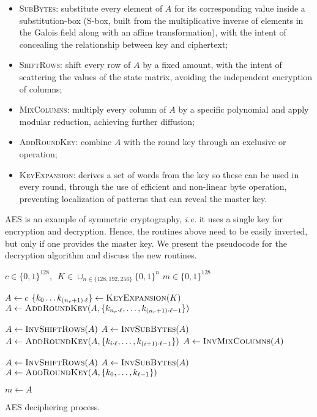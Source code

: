 \documentclass{../sftex/sftex}
\newcommand{\binwds}[1]{\{0, 1\}^{#1}}
\begin{document}
\begin{itemize}
  \item \textsc{SubBytes}: substitute every element of $A$ for its
      corresponding value inside a substitution-box (S-box, built from the
        multiplicative inverse of elements in the Galois field along with an
        affine transformation), with the intent of concealing the relationship
        between key and ciphertext;
  \item \textsc{ShiftRows}: shift every row of $A$ by a fixed amount, with the
      intent of scattering the values of the state matrix, avoiding the
        independent encryption of columns;
  \item \textsc{MixColumns}: multiply every column of $A$ by a specific
      polynomial and apply modular reduction, achieving further diffusion;
  \item \textsc{AddRoundKey}: combine $A$ with the round key through an
      exclusive or operation;
  \item \textsc{KeyExpansion}: derives a set of words from the key so these can
      be used in every round, through the use of efficient and non-linear byte
        operation, preventing localization of patterns that can reveal the
        master key.
\end{itemize}

AES is an example of symmetric cryptography, \emph{i.e.} it uses a single key
for encryption and decryption. Hence, the routines above need to be easily
inverted, but only if one provides the master key. We present the pseudocode
for the decryption algorithm and discuss the new routines.

\begin{algorithm}
  \begin{algorithmic}
    \REQUIRE{}  $c \in \binwds{128}, \enspace
      K \in \cup_{n \in \{128, 192, 256\}} \binwds{n}$
    \ENSURE{}  $m \in \binwds{128}$ 

    \STATE{}  $A \leftarrow c$
    \STATE{}  $\{k_{0} \dots k_{(n_{r} + 1) \cdot \ell}\}
      \leftarrow \textsc{KeyExpansion}(K)$
    \STATE{}  $A \leftarrow \textsc{AddRoundKey}(A,
      \{k_{n_{r} \cdot \ell}, \dots, k_{(n_{r} + 1) \cdot \ell - 1}\})$

      \STATE{}  $A \leftarrow \textsc{InvShiftRows}(A)$
      \STATE{}  $A \leftarrow \textsc{InvSubBytes}(A)$
      \STATE{}  $A \leftarrow \textsc{AddRoundKey}(A,
        \{k_{i \cdot \ell}, \dots, k_{(i + 1) \cdot \ell - 1}\})$
      \STATE{}  $A \leftarrow \textsc{InvMixColumns}(A)$
    \ENDFOR{}

    \STATE{}  $A \leftarrow \textsc{InvShiftRows}(A)$
    \STATE{}  $A \leftarrow \textsc{InvSubBytes}(A)$
    \STATE{}  $A \leftarrow \textsc{AddRoundKey}(A,
      \{k_{0}, \dots, k_{\ell - 1}\})$

    \STATE{}  $m \leftarrow A$
  \end{algorithmic}
  \caption{AES deciphering process.}\label{alg:aesdecrypt}
\end{algorithm}
\end{document}
